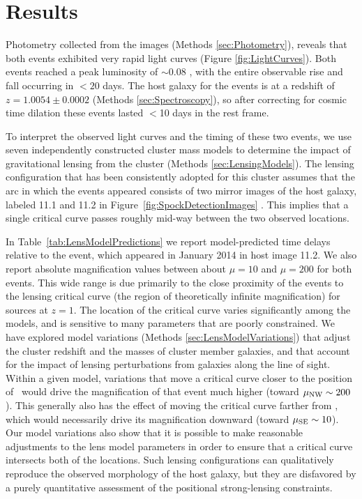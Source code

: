 \section{Results}\label{sec:Results}

Photometry collected from the \HST images (Methods
\ref{sec:Photometry}), reveals that both \spock events exhibited very
rapid light curves (Figure \ref{fig:LightCurves}).  Both events
reached a peak luminosity of $\sim$0.08 \microjansky, with the entire
observable rise and fall occurring in $<20$ days.  The host galaxy for
the \spock events is at a redshift of $z=1.0054\pm0.0002$ (Methods
\ref{sec:Spectroscopy}), so after correcting for cosmic time dilation
these events lasted $<$10 days in the rest frame.

To interpret the observed light curves and the timing of these two
events, we use seven independently constructed cluster mass models to
determine the impact of gravitational lensing from the 
cluster (Methods \ref{sec:LensingModels}).  The lensing configuration
that has been consistently adopted for this cluster assumes that the
arc in which the \spock events appeared consists of two mirror images
of the host galaxy, labeled 11.1 and 11.2 in
Figure~\ref{fig:SpockDetectionImages} \citep{Zitrin:2013a,
  Jauzac:2014, Johnson:2014, Richard:2014, Diego:2015a, Grillo:2015,
  Hoag:2016, Sebesta:2016, Caminha:2017}.  This implies that a single
critical curve passes roughly mid-way between the two observed \spock
locations.

In Table~\ref{tab:LensModelPredictions} we report model-predicted time
delays relative to the \spockone event, which appeared in January 2014
in host image 11.2.  We also report absolute magnification values
between about $\mu=10$ and $\mu=200$ for both events. This wide range
is due primarily to the close proximity of the \spock events to the
lensing critical curve (the region of theoretically infinite
magnification) for sources at $z=1$.  The location of the critical
curve varies significantly among the models, and is sensitive to many
parameters that are poorly constrained.  We have explored model
variations (Methods \ref{sec:LensModelVariations}) that adjust the
cluster redshift and the masses of cluster member galaxies, and that
account for the impact of lensing perturbations from galaxies along
the line of sight.  Within a given model, variations that move a
critical curve closer to the position of \spockone\ would drive the
magnification of that event much higher (toward $\mu_{\rm
  NW}\sim200$).  This generally also has the effect of moving the
critical curve farther from \spocktwo, which would necessarily drive
its magnification downward (toward $\mu_{\rm SE}\sim10$).  Our model
variations also show that it is possible to make reasonable
adjustments to the lens model parameters in order to ensure that a
critical curve intersects both of the \spock locations.  Such lensing
configurations can qualitatively reproduce the observed morphology of
the \spock host galaxy, but they are disfavored by a purely
quantitative assessment of the positional strong-lensing constraints.

